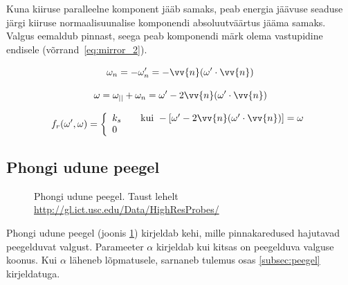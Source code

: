 \documentclass[a4paper,12pt]{report}
\renewcommand{\vec}[1]{\vv{#1}}
\begin{document}
Kuna kiiruse paralleelne komponent jääb samaks, peab energia jäävuse
seaduse järgi kiiruse normaalisuunalise komponendi absoluutväärtus jääma
samaks. Valgus eemaldub pinnast, seega peab komponendi märk olema vastupidine
endisele (võrrand~\ref{eq:mirror_2}).

\begin{equation} \label{eq:mirror_2}
\omega_n = -\omega'_n = -\vec n(\omega'\cdot\vec n)
\end{equation}

\begin{minipage}{0.5\textwidth}
\[\omega = \omega_{||} + \omega_n = \omega' - 2\vec n(\omega'\cdot\vec n)\]
\end{minipage}

\[f_r(\omega', \omega) = \left\{\begin{array}{l l} k_s & \quad \text{kui} ~ -[\omega'-2\vec n(\omega'\cdot\vec n)] = \omega \\ 0 \end{array} \right. \]

\subsection{Phongi udune peegel}
\begin{figure}[h]
\centering
{}
\caption[Phongi udune peegel]{Phongi udune peegel. Taust lehelt \url{http://gl.ict.usc.edu/Data/HighResProbes/}}
\label{fig:phong}
\vspace{100pt}
\end{figure}
Phongi udune peegel (joonis \ref{fig:phong}) kirjeldab kehi, mille pinnakaredused hajutavad
peegelduvat valgust. Parameeter \(\alpha\) kirjeldab kui kitsas on peegelduva
valguse koonus. Kui \(\alpha\) läheneb lõpmatusele, sarnaneb tulemus
osas \ref{subsec:peegel} kirjeldatuga.
\end{document}
